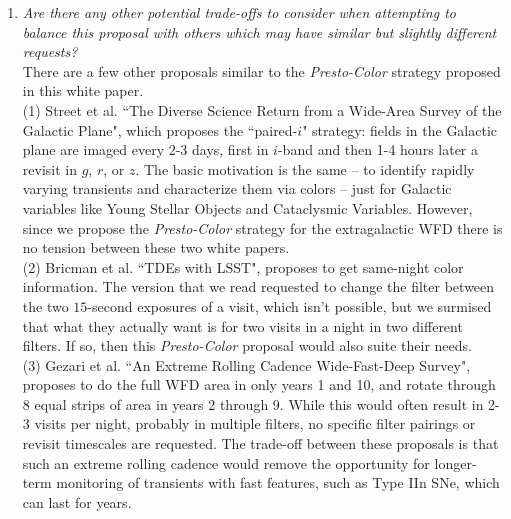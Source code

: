 \documentclass[12pt, letterpaper]{article}
\begin{document}
\begin{enumerate}
    \item {\footnotesize {\it Are there any other potential trade-offs to consider when attempting to balance this proposal with others which may have similar but slightly different requests?}} \\ There are a few other proposals similar to the {\em Presto-Color} strategy proposed in this white paper. \\ (1) Street et al. ``The Diverse Science Return from a Wide-Area Survey of the Galactic Plane", which proposes the ``paired-$i$" strategy: fields in the Galactic plane are imaged every 2-3 days, first in $i$-band and then 1-4 hours later a revisit in $g$, $r$, or $z$. The basic motivation is the same -- to identify rapidly varying transients and characterize them via colors -- just for Galactic variables like Young Stellar Objects and Cataclysmic Variables. However, since we propose the {\em Presto-Color} strategy for the extragalactic WFD there is no tension between these two white papers. \\ (2) Bricman et al. ``TDEs with LSST", proposes to get same-night color information. The version that we read requested to change the filter between the two $15$-second exposures of a visit, which isn't possible, but we surmised that what they actually want is for two visits in a night in two different filters. If so, then this {\em Presto-Color} proposal would also suite their needs. \\ (3) Gezari et al. ``An Extreme Rolling Cadence Wide-Fast-Deep Survey", proposes to do the full WFD area in only years 1 and 10, and rotate through 8 equal strips of area in years 2 through 9. While this would often result in 2-3 visits per night, probably in multiple filters, no specific filter pairings or revisit timescales are requested. The trade-off between these proposals is that such an extreme rolling cadence would remove the opportunity for longer-term monitoring of transients with fast features, such as Type IIn SNe, which can last for years. 
\end{enumerate}


\clearpage
\end{document}
